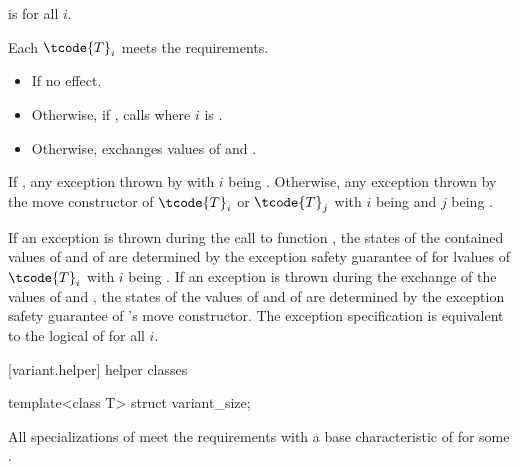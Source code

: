 \begin{itemdescr}
\pnum
\mandates
{} is  for all $i$.

\pnum
\expects
Each $\tcode{T}_i$ meets the  requirements.

\pnum
\effects
\begin{itemize}
\item
If  no effect.
\item
Otherwise, if , calls  where $i$ is .
\item
Otherwise, exchanges values of  and .
\end{itemize}

\pnum
\throws
If ,
any exception thrown by 
with $i$ being .
Otherwise, any exception thrown by the move constructor
of $\tcode{T}_i$ or $\tcode{T}_j$
with $i$ being  and $j$ being .

\pnum
\remarks
If an exception is thrown during the call to function ,
the states of the contained values of  and of  are
determined by the exception safety guarantee of  for lvalues of
$\tcode{T}_i$ with $i$ being .
If an exception is thrown during the exchange of the values of 
and , the states of the values of  and of 
are determined by the exception safety guarantee of 's move constructor.
The exception specification is equivalent to the logical  of
 for all $i$.
\end{itemdescr}

[variant.helper]{ helper classes}

%
\begin{itemdecl}
template<class T> struct variant_size;
\end{itemdecl}

\begin{itemdescr}
\pnum
All specializations of  meet the
 requirements
with a base characteristic of  for some .
\end{itemdescr}

